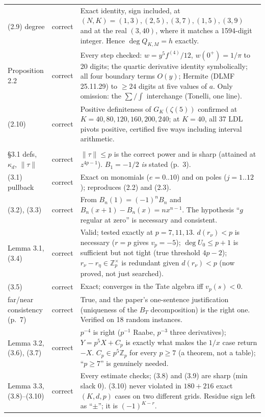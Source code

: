 \documentclass[11pt]{article}
\theoremstyle{definition}
\newcommand{\z}{\zeta(5)}
\newcommand{\OK}{correct}
\begin{document}
\begin{longtable}{@{}p{2.55cm}p{1.75cm}p{9.5cm}@{}}
(2.9) degree & \OK & Exact identity, sign included, at $(N,K)=(1,3),(2,5),(3,7),(1,5),(3,9)$ and at the real $(3,40)$, where it matches a 1594-digit integer. Hence $\deg Q_{K,M}=h$ exactly. \\
Proposition 2.2 & \OK & Every step checked: $w=y^5f^{(4)}/12$, $w(0^+)=1/\pi$ to 20 digits; the quartic derivative identity symbolically; all four boundary terms $O(y)$; Hermite (DLMF 25.11.29) to $\ge24$ digits at five values of $a$. Only omission: the $\sum/\int$ interchange (Tonelli, one line). \\
(2.10) & \OK & Positive definiteness of $G_K(\z)$ confirmed at $K=40,80,120,160,200,240$; at $K=40$, all 37 LDL pivots positive, certified five ways including interval arithmetic. \\
\addlinespace
\multicolumn{3}{@{}l}{\textbf{Section 3}}\\
\S3.1 defs, $\kappa_d$, $\|\tau\|$ & \OK & $\|\tau\|\le p$ is the correct power and is sharp (attained at $z^{4p-1}$). $B_1=-1/2$ \emph{is} stated (p.~3). \\
(3.1) pullback & \OK & Exact on monomials ($e=0..10$) and on poles ($j=1..12$); reproduces (2.2) and (2.3). \\
(3.2), (3.3) & \OK & From $B_n(1)=(-1)^nB_n$ and $B_n(x{+}1)-B_n(x)=nx^{n-1}$. The hypothesis ``$g$ regular at zero'' is necessary and consistent. \\
Lemma 3.1, (3.4) & \OK & Valid; tested exactly at $p=7,11,13$. $d(r_\nu)<p$ is necessary ($r=p$ gives $v_p=-5$); $\deg U_0\le p+1$ is sufficient but not tight (true threshold $4p-2$); $r_\nu-r_\eta\in\mathbb{Z}_p^\times$ is redundant given $d(r_\nu)<p$ (now proved, not just searched). \\
(3.5) & \OK & Exact; converges in the Tate algebra iff $v_p(s)<0$. \\
far/near consistency (p.~7) & \OK & True, and the paper's one-sentence justification (uniqueness of the $B_T$ decomposition) is the right one. Verified on 18 random instances. \\
Lemma 3.2, (3.6), (3.7) & \OK & $p^{-4}$ is right ($p^{-1}$ Raabe, $p^{-3}$ three derivatives); $Y=p^5X+C_p$ is exactly what makes the $1/x$ case return $-X$. $C_p\in p^5\mathbb{Z}_p$ for every $p\ge7$ (a theorem, not a table); ``$p\ge7$'' is genuinely needed. \\
Lemma 3.3, (3.8)--(3.10) & \OK & Every estimate checks; (3.8) and (3.9) are sharp (min slack 0). (3.10) never violated in $180+216$ exact $(K,d,p)$ cases on two different grids. Residue sign left as ``$\pm$''; it is $(-1)^{K-r}$. \\

\end{longtable}
\end{document}
